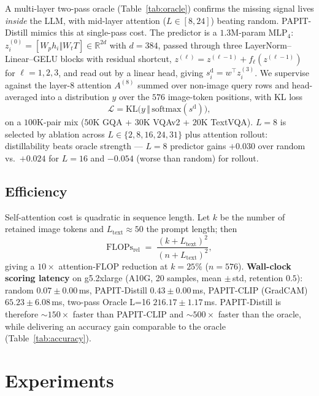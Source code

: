 \documentclass[10pt,twocolumn,letterpaper]{article}
\begin{document}
A multi-layer two-pass oracle (Table~\ref{tab:oracle}) confirms the
missing signal lives \emph{inside} the LLM, with mid-layer attention
($L\!\in\![8,24]$) beating random. PAPIT-Distill mimics this at
single-pass cost. The predictor is a $1.3$M-param $\mathrm{MLP}_4$:
$z_i^{(0)} = [W_p h_i \Vert W_t T] \in \mathbb{R}^{2d}$ with
$d{=}384$, passed through three LayerNorm--Linear--GELU blocks with
residual shortcut, $z^{(\ell)} = z^{(\ell-1)} + f_\ell(z^{(\ell-1)})$
for $\ell{=}1{,}2{,}3$, and read out by a linear head, giving
$s^{\text{d}}_i = w^\top z_i^{(3)}$. We supervise against the
layer-$8$ attention $A^{(8)}$ summed over non-image query rows and
head-averaged into a distribution $y$ over the $576$ image-token
positions, with KL loss
\begin{equation}
  \mathcal{L} = \mathrm{KL}\bigl(y\,\Vert\,\mathrm{softmax}(s^{\text{d}})\bigr),
  \label{eq:kl}
\end{equation}
on a $100$K-pair mix ($50$K GQA + $30$K VQAv2 + $20$K TextVQA).
$L\!=\!8$ is selected by ablation across $L\!\in\!\{2,8,16,24,31\}$
plus attention rollout: distillability beats oracle strength —
$L\!=\!8$ predictor gains $+0.030$ over random vs.\ $+0.024$ for
$L\!=\!16$ and $-0.054$ (worse than random) for rollout.

\subsection{Efficiency}
Self-attention cost is quadratic in sequence length. Let $k$ be the
number of retained image tokens and $L_{\text{text}}\!\approx\!50$
the prompt length; then
\begin{equation}
  \text{FLOPs}_{\text{rel}}
  \;=\;\frac{(k+L_{\text{text}})^2}{(n+L_{\text{text}})^2},
  \label{eq:flops}
\end{equation}
giving a $10\times$ attention-FLOP reduction at $k{=}25\%$ ($n{=}576$).
\textbf{Wall-clock scoring latency} on g5.2xlarge (A10G, 20 samples,
mean $\pm$\,std, retention $0.5$): random $0.07{\pm}0.00$\,ms,
PAPIT-Distill $\mathbf{0.43{\pm}0.00}$\,ms, PAPIT-CLIP
(GradCAM) $65.23{\pm}6.08$\,ms, two-pass Oracle L=16
$216.17{\pm}1.17$\,ms. PAPIT-Distill is therefore
$\sim\!150\times$ faster than PAPIT-CLIP and $\sim\!500\times$ faster
than the oracle, while delivering an accuracy gain comparable to the
oracle (Table~\ref{tab:accuracy}).

\section{Experiments}
\label{sec:experiments}
\end{document}
